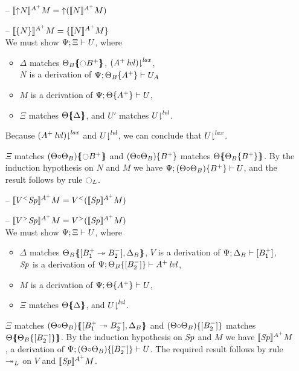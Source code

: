 \begin{itemize}
\item[--] $\lsubsta{\tupl{N}}{M}{A^+} = \tupl{(\lsubsta{N}{M}{A^+})}$
\item[--] $\lsubsta{\tlaxl{N}}{M}{A^+} = \tlaxl{\lsubsta{N}{M}{A^+}}$\smallskip\\
  We must show $\foc{\Psi}{\Xi}{U}$, where
  \begin{itemize}
  \item $\Delta$ matches $\frameoff{\Theta_B}{{\ocircle}B^+}$, 
     $\restrictfrom{(\islvl{A^+})}{\mlax}$,\\
     $N$ is a derivation of $\foc{\Psi}{\tackon{\Theta_B}{A^+}}{U_A}$
  \item $M$ is a derivation of $\foc{\Psi}{\tackon{\Theta}{A^+}}{U}$,
  \item $\Xi$ matches $\frameoff{\Theta}{\Delta}$, and $U'$ matches 
     $\restrictfrom{U}{\mlvl}$.
  \end{itemize}
  Because $\restrictfrom{(\islvl{A^+})}{\mlax}$ and $\restrictfrom{U}{\mlvl}$, 
  we can conclude that 
  $\restrictfrom{U}{\mlax}$. 

  $\Xi$ matches $\frameoff{(\Theta{\circ}\Theta_B)}{{\ocircle}B^+}$
  and $\tackon{(\Theta{\circ}\Theta_B)}{B^+}$ matches 
  $\frameoff{\Theta}{\tackon{\Theta_B}{B^+}}$.
  By the induction hypothesis on $N$ and $M$ we have
  $\foc{\Psi}{\tackon{(\Theta{\circ}\Theta_B)}{B^+}}{U}$,
  and the result follows by rule ${\ocircle}_L$.  \smallskip

\item[--] $\lsubsta{\tappl{V}{\Sp}}{M}{A^+} 
           = \tappl{V}{(\lsubsta{\Sp}{M}{A^+})}$
\item[--] $\lsubsta{\tappr{V}{\Sp}}{M}{A^+} 
           = \tappr{V}{(\lsubsta{\Sp}{M}{A^+})}$\smallskip\\
  We must show $\foc{\Psi}{\Xi}{U}$, where
  \begin{itemize}
  \item $\Delta$ matches 
     $\frameoff{\Theta_B}{\matchconj{[B_1^+ \righti B_2^-]}{\Delta_B}}$,
     $V$ is a derivation of $\foc{\Psi}{\Delta_B}{[B_1^+]}$, \\
     $\Sp$ is a derivation of 
     $\foc{\Psi}{\tackon{\Theta_B}{[B_2^-]}}{\islvl{A^+}}$,
  \item $M$ is a derivation of $\foc{\Psi}{\tackon{\Theta}{A^+}}{U}$,
  \item $\Xi$ matches $\frameoff{\Theta}{\Delta}$, and 
     $\restrictfrom{U}{\mlvl}$.
  \end{itemize}
  $\Xi$ matches 
  $\frameoff{(\Theta{\circ}\Theta_B)}
    {\matchconj{[B_1^+ \righti B_2^-]}{\Delta_B}}$
  and $\tackon{(\Theta{\circ}\Theta_B)}{[B_2^-]}$ matches 
  $\frameoff{\Theta}{\tackon{\Theta_B}{[B_2^-]}}$.
  By the induction hypothesis on $\Sp$ and $M$ we have
  $\lsubsta{\Sp}{M}{A^+}$, a derivation of
  $\foc{\Psi}{\tackon{(\Theta{\circ}\Theta_B)}{[B_2^-]}}{U}$.
  The required result follows by rule ${\righti}_L$ on $V$ and 
  $\lsubsta{\Sp}{M}{A^+}$.  \smallskip


\end{itemize}
